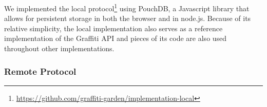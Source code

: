 We implemented the local protocol\footnote{
    \url{https://github.com/graffiti-garden/implementation-local}
} using PouchDB, a Javascript library that allows for persistent
storage in both the browser and in node.js.
Because of its relative simplicity, the local implementation also serves
as a reference implementation of the Graffiti API and pieces of its code are also used
throughout other implementations.








\subsubsection{Remote Protocol}

